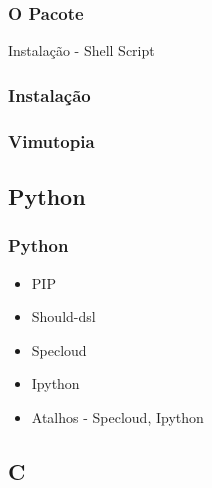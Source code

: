 \documentclass[]{beamer}
\begin{document}
\begin{frame}
    \frametitle{O Pacote}
        Instalação - Shell Script
\end{frame}

\begin{frame}
    \frametitle{Instalação}
    \begin{center}
    \end{center}
\end{frame}

\begin{frame}
    \frametitle{Vimutopia}
    \begin{center}
    \end{center}
\end{frame}
\subsection{Python}

\begin{frame}
    \frametitle{Python}
    \begin{itemize}
        \item<1-> PIP
        \item<2-> Should-dsl
        \item<3-> Specloud
        \item<4-> Ipython
        \item<5-> Atalhos - Specloud, Ipython
    \end{itemize}
\end{frame}

\subsection{C}
\end{document}

